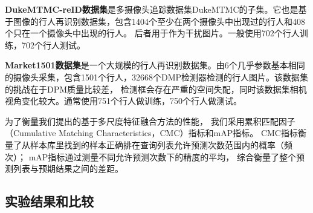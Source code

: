 



\textbf{DukeMTMC-reID数据集}是多摄像头追踪数据集DukeMTMC的子集。它也是基于图像的行人再识别数据集，包含1404个至少在两个摄像头中出现过的行人和408个只在一个摄像头中出现的行人。
后者用于作为干扰图片。一般使用702个行人训练，702个行人测试。

\textbf{Market1501数据集}是一个大规模的行人再识别数据集。由6个几乎参数基本相同的摄像头采集，包含1501个行人，32668个DMP检测器检测的行人图片。该数据集的挑战在于DPM质量比较差，
检测框会存在严重的空间失配，同时该数据集相机视角变化较大。通常使用751个行人做训练，750个行人做测试。

为了衡量我们提出的基于多尺度特征融合方法的性能，
我们采用累积匹配因子（Cumulative Matching Characteristics，CMC）指标和mAP指标。
CMC指标衡量了从样本库里找到的样本正确排在查询列表允许预测次数范围内的概率（频次）；
mAP指标通过测量不同允许预测次数下的精度的平均，
综合衡量了整个预测列表与预期结果之间的差距。


\subsection{实验结果和比较}


